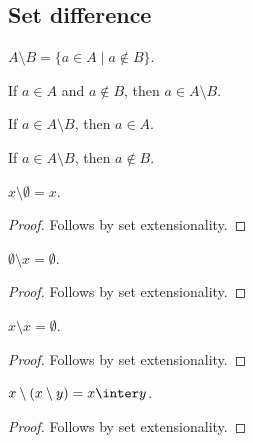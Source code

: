 \subsection{Set difference}

\begin{definition}\label{setminus}
    $A\setminus B = \{ a \in A \mid a\not\in B\}$.
\end{definition}

\begin{proposition}\label{setminus_intro}
    If $a\in A$ and $a\notin B$, then $a\in A\setminus B$.
\end{proposition}

\begin{proposition}\label{setminus_elim_left}
    If $a\in A\setminus B$, then $a\in A$.
\end{proposition}

\begin{proposition}\label{setminus_elim_right}
    If $a\in A\setminus B$, then $a\notin B$.
\end{proposition}

\begin{proposition}\label{setminus_emptyset}
    $x\setminus \emptyset = x$.
\end{proposition}
\begin{proof}
    Follows by set extensionality.
\end{proof}

\begin{proposition}\label{emptyset_setminus}
    $\emptyset\setminus x = \emptyset$.
\end{proposition}
\begin{proof}
    Follows by set extensionality.
\end{proof}

\begin{proposition}\label{setminus_self}
    $x\setminus x = \emptyset$.
\end{proposition}
\begin{proof}
    Follows by set extensionality.
\end{proof}

\begin{proposition}\label{setminus_setminus}
    $x\setminus (x\setminus y) = x\inter y$.
\end{proposition}
\begin{proof}
    Follows by set extensionality.
\end{proof}

